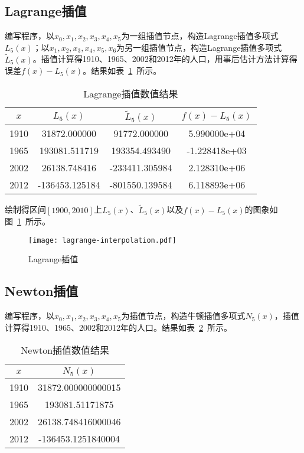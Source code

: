 \documentclass[degree=report, output=electronic]{ustcthesis}
\begin{document}
\subsection{Lagrange插值}

编写程序，以$x_0,x_1,x_2,x_3,x_4,x_5$为一组插值节点，构造Lagrange插值多项式$L_5(x)$；以$x_1,x_2,x_3,x_4,x_5,x_6$为另一组插值节点，构造Lagrange插值多项式$\tilde{L}_5(x)$。插值计算得1910、1965、2002和2012年的人口，用事后估计方法计算得误差$f(x)-L_5(x)$。结果如表~\ref{tab:lagrange-output}~所示。

\begin{table}[h]
  \centering
  \caption{Lagrange插值数值结果}
  \label{tab:lagrange-output}
  \begin{tabular}{c*{3}c}
    \toprule
    $x$  & $L_5(x)$       & $\tilde{L}_5(x)$ & $f(x)-L_5(x)$ \\
    \midrule
    1910 & 31872.000000   & 91772.000000     & 5.990000e+04  \\
    1965 & 193081.511719  & 193354.493490    & -1.228418e+03 \\
    2002 & 26138.748416   & -233411.305984   & 2.128310e+06  \\
    2012 & -136453.125184 & -801550.139584   & 6.118893e+06  \\
    \bottomrule
  \end{tabular}
\end{table}

绘制得区间$[1900,2010]$上$L_5(x)$、$\tilde{L}_5(x)$以及$f(x)-L_5(x)$的图象如图~\ref{fig:lagrange}~所示。

\newpage

\begin{figure}[h]
  \centering
  \texttt{[image: lagrange-interpolation.pdf]}
  \caption{Lagrange插值}
  \label{fig:lagrange}
\end{figure}

\subsection{Newton插值}

编写程序，以$x_0,x_1,x_2,x_3,x_4,x_5$为插值节点，构造牛顿插值多项式$N_5(x)$，插值计算得1910、1965、2002和2012年的人口。结果如表~\ref{tab:newton-output}~所示。

\begin{table}[h]
  \centering
  \caption{Newton插值数值结果}
  \label{tab:newton-output}
  \begin{tabular}{cc}
    \toprule
    $x$  & $N_5(x)$           \\
    \midrule
    1910 & 31872.000000000015 \\
    1965 & 193081.51171875    \\
    2002 & 26138.748416000046 \\
    2012 & -136453.1251840004 \\
    \bottomrule
  \end{tabular}
\end{table}
\end{document}
